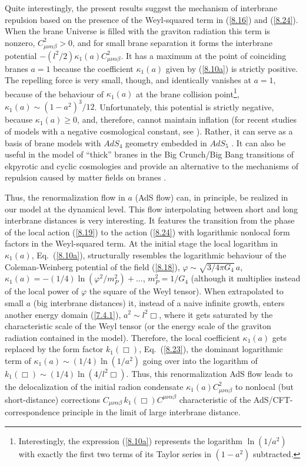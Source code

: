 \documentclass[a4paper,preprint,nofootinbib,
                 showpacs,preprintnumbers,amsmath,amssymb]{revtex4}
\begin{document}
Quite interestingly, the  
present results suggest the mechanism of interbrane repulsion 
based on the presence of the Weyl-squared term in (\ref{8.16}) and  
(\ref{8.24}). When the brane Universe is filled with the graviton 
radiation this term is nonzero, $C_{\mu\nu\alpha\beta}^2>0$,  
and for small brane separation it forms the interbrane potential 
$-(l^2/2)\kappa_1(a)C_{\mu\nu\alpha\beta}^2$. It has a maximum 
at the point of coinciding branes $a=1$ because the coefficient 
$\kappa_1(a)$ given by (\ref{8.10a}) is strictly positive. The 
repelling force is very small, though, and identically vanishes  
at $a=1$, because of the behaviour of $\kappa_1(a)$ at the brane 
collision point\footnote{Interestingly, the expression (\ref{8.10a}) 
represents  the logarithm $\ln(1/a^2)$ with exactly  
the first two terms of its Taylor series in $(1-a^2)$  
subtracted.}, $\kappa_1(a)\sim(1-a^2)^3/12$. Unfortunately, this 
potential is strictly negative, because $\kappa_1(a)\geq 0$, and,  
therefore, cannot maintain  
inflation (for recent studies of models with a negative cosmological  
constant, see \cite{FFKL}). Rather, it can serve as a basis of brane 
models with $AdS_4$ geometry embedded in $AdS_5$ \cite{AdS_4brane}. 
It can also be useful in the model of ``thick'' branes in the  
Big Crunch/Big Bang transitions \cite{TurToll} of ekpyrotic and 
cyclic cosmologies \cite{Ekpyr,cycle} and provide an alternative  
to the mechanisms of repulsion caused by matter fields on branes  
\cite{Wiseman}. 
 
Thus, the renormalization flow in $a$ (AdS flow) can, in principle,  
be realized in our model at the dynamical level. This flow  
interpolating between  short and long  
interbrane distances is very interesting. It features the 
transition from the phase of the local action (\ref{8.19}) to 
the action (\ref{8.24}) with logarithmic nonlocal form factors in the 
Weyl-squared term. At the initial stage the local logarithm in 
$\kappa_1(a)$, Eq.~(\ref{8.10a}), structurally  
resembles the logarithmic behaviour of the Coleman-Weinberg potential 
of the field (\ref{8.18}), $\varphi\sim\sqrt{3/4\pi G_4}\,a$,  
$\kappa_1(a)=-(1/4)\ln(\varphi^2/m_P^2)+...$, $m_P^2=1/G_4$ 
(although it multiplies instead of the local power of $\varphi$ the 
square of the Weyl tensor). When extrapolated to small $a$ (big  
interbrane distances) it, instead of a naive infinite growth, enters 
another energy domain (\ref{7.4.1}),  
$a^2\sim l^2\Box$, where it gets saturated by the 
characteristic scale of the Weyl tensor (or the energy scale of the 
graviton radiation contained in the model). Therefore, the local  
coefficient $\kappa_1(a)$ gets replaced by the form factor  
$k_1(\Box)$, Eq.~(\ref{8.23}), the dominant logarithmic term of  
$\kappa_1(a)\sim(1/4)\ln(1/a^2)$ going over into the  
logarithm of $k_1(\Box)\sim (1/4)\ln(4/l^2\Box)$. Thus, this  
renormalization AdS flow leads to the delocalization of the 
initial radion condensate $\kappa_1(a)C_{\mu\nu\alpha\beta}^2$ 
to nonlocal (but short-distance) corrections  
$C_{\mu\nu\alpha\beta}\,k_1(\Box)C^{\mu\nu\alpha\beta}$ 
characteristic of the AdS/CFT-correspondence principle in the limit of 
large interbrane distance. 
 
\end{document}
